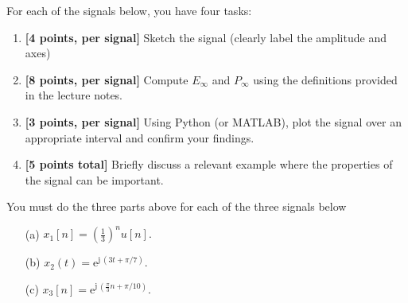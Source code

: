 \documentclass{ee102_pset}
\begin{document}
For each of the signals below, you have four tasks:
\begin{enumerate}
  \item \textbf{[4 points, per signal]} Sketch the signal (clearly label the amplitude and axes)
  \item \textbf{[8 points, per signal]} Compute \(E_{\infty}\) and \(P_{\infty}\) using the definitions provided in the lecture notes.
  \item \textbf{[3 points, per signal]} Using Python (or MATLAB), plot the signal over an appropriate interval and confirm your findings.
  \item \textbf{[5 points total]} Briefly discuss a relevant example where the properties of the signal can be important.
\end{enumerate}
You must do the three parts above for each of the three signals below
\begin{enumerate}
\item[(a)] $x_1[n] = \left(\tfrac{1}{3}\right)^{n} u[n].$

\item[(b)] $x_2(t) = \mathrm{e}^{\mathrm{j}\,(3t+\pi/7)}.$

\item[(c)] $x_3[n] = \mathrm{e}^{\mathrm{j}\,(\tfrac{\pi}{3}n+\pi/10)}.$
\end{enumerate}
\end{document}
